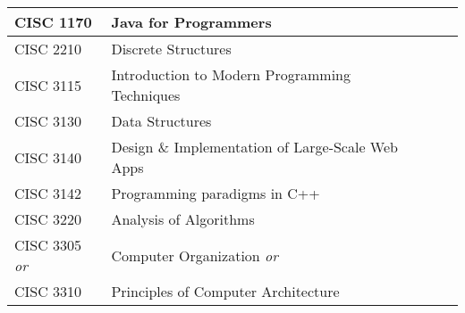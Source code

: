 \documentclass{article}
\begin{document}
\begin{Form}
\begin{tabular}{ |p{3.27cm}|p{6cm}|p{4.8cm}|p{2.3cm}|  }
		CISC 1170           & Java for Programmers                             & \TextField[name=1170_instructor,width=4.8cm,charsize=8pt,bordercolor=1 1 1,borderstyle=U]{} & \TextField[name=1170_grade,width=2.2cm,charsize=8pt,bordercolor=1 1 1]{{}} \\
		\hline
		CISC 2210           & Discrete Structures                              & \TextField[name=2210_instructor,width=4.8cm,charsize=8pt,bordercolor=1 1 1,borderstyle=U]{} & \TextField[name=2210_grade,width=2.2cm,charsize=8pt,bordercolor=1 1 1]{{}} \\
		\hline
		CISC 3115           & Introduction to Modern Programming Techniques    & \TextField[name=3115_instructor,width=4.8cm,charsize=8pt,bordercolor=1 1 1,borderstyle=U]{} & \TextField[name=3115_grade,width=2.2cm,charsize=8pt,bordercolor=1 1 1]{{}} \\
		\hline
		CISC 3130           & Data Structures                                  & \TextField[name=3130_instructor,width=4.8cm,charsize=8pt,bordercolor=1 1 1,borderstyle=U]{} & \TextField[name=3130_grade,width=2.2cm,charsize=8pt,bordercolor=1 1 1]{{}} \\
		\hline
		CISC 3140           & Design \& Implementation of Large-Scale Web Apps & \TextField[name=3140_instructor,width=4.8cm,charsize=8pt,bordercolor=1 1 1,borderstyle=U]{} & \TextField[name=3140_grade,width=2.2cm,charsize=8pt,bordercolor=1 1 1]{{}} \\
		\hline
		CISC 3142           & Programming paradigms in C++                     & \TextField[name=3142_instructor,width=4.8cm,charsize=8pt,bordercolor=1 1 1,borderstyle=U]{} & \TextField[name=3142_grade,width=2.2cm,charsize=8pt,bordercolor=1 1 1]{{}} \\
		\hline
		CISC 3220           & Analysis of Algorithms                           & \TextField[name=3220_instructor,width=4.8cm,charsize=8pt,bordercolor=1 1 1,borderstyle=U]{} & \TextField[name=3220_grade,width=2.2cm,charsize=8pt,bordercolor=1 1 1]{{}} \\
		\hline
		CISC 3305 \emph{or} & Computer Organization \emph{or}                  & \TextField[name=3305_instructor,width=4.8cm,charsize=8pt,bordercolor=1 1 1,borderstyle=U]{} & \TextField[name=3305_grade,width=2.2cm,charsize=8pt,bordercolor=1 1 1]{{}} \\
		CISC 3310           & Principles of Computer Architecture              & \TextField[name=3310_instructor,width=4.8cm,charsize=8pt,bordercolor=1 1 1,borderstyle=U]{} & \TextField[name=3310_grade,width=2.2cm,charsize=8pt,bordercolor=1 1 1]{{}} \\

\end{tabular}
\end{Form}
\end{document}
